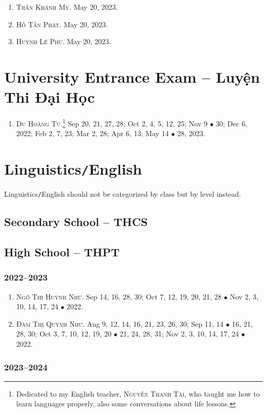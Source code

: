 \documentclass{article}
\begin{document}
\begin{enumerate}
	\item \textsc{Trần Khánh My.} May 20, 2023.
	\item \textsc{Hồ Tấn Phát.} May 20, 2023.
	\item \textsc{Huỳnh Lê Phú.} May 20, 2023.
\end{enumerate}


\section{University Entrance Exam -- Luyện Thi Đại Học}

\begin{enumerate}
	\item \textsc{Du Hoàng Tú.}\footnote{Dedicated to my English teacher, \textsc{Nguyễn Thanh Tài}, who taught me how to learn languages properly, also some conversations about life lessons.} {\sf[In]} Sep 20, 21, 27, 28; Oct 2, 4, 5, 12, 25; Nov 9 $\bullet$ 30; Dec 6, 2022; Feb 2, 7, 23; Mar 2, 28; Apr 6, 13; May 14 $\bullet$ 28, 2023.
\end{enumerate}


\section{Linguistics\texttt{/}English}
Linguistics\texttt{/}English should not be categorized by class but by level instead.

\subsection{Secondary School -- THCS}


\subsection{High School -- THPT}

\subsubsection{2022--2023}

\begin{enumerate}
	\item \textsc{Ngô Thị Huỳnh Như.} {\sf[In]} Sep 14, 16, 28, 30; Oct 7, 12, 19, 20, 21, 28 $\bullet$ Nov 2, 3, 10, 14, 17, 24 $\bullet$ 2022. {\sf[Out]}
	\item \textsc{Đàm Thị Quỳnh Như.} {\sf[In]} Aug 9, 12, 14, 16, 21, 23, 26, 30; Sep 11, 14 $\bullet$ 16, 21, 28, 30; Oct 3, 7, 10, 12, 19, 20 $\bullet$ 21, 24, 28, 31; Nov 2, 3, 10, 14, 17, 24 $\bullet$ 2022. {\sf[Out]}
\end{enumerate}

\subsubsection{2023--2024}


\printbibliography[heading=bibintoc]
	
\end{document}
